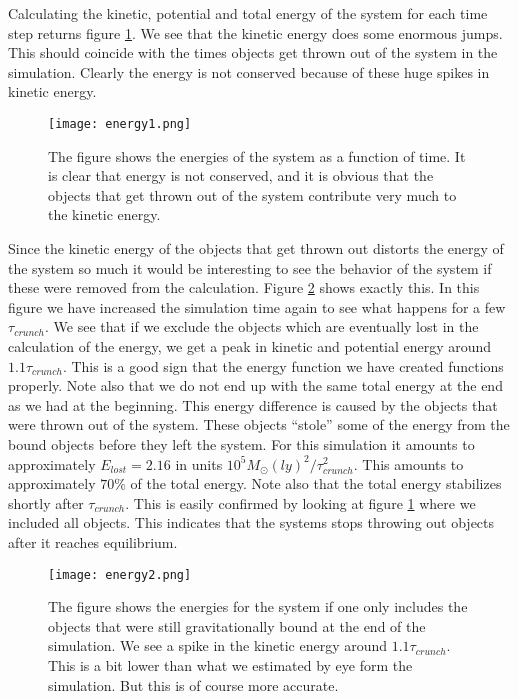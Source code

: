 \documentclass{aa}   %
\begin{document}
Calculating the kinetic, potential and total energy of the system for each time step returns figure \ref{energy1}. We see that the kinetic energy does some enormous jumps. This should coincide with the times objects get thrown out of the system in the simulation. Clearly the energy is not conserved because of these huge spikes in kinetic energy.
\begin{figure}[hbtp]
 \centering
 \texttt{[image: energy1.png]}
 \caption[]{\label{energy1}
   The figure shows the energies of the system as a function of time. It is clear that energy is not conserved, and it is obvious that the objects that get thrown out of the system contribute very much to the kinetic energy. 
 }
\end{figure}
Since the kinetic energy of the objects that get thrown out distorts the energy of the system so much it would be interesting to see the behavior of the system if these were removed from the calculation. Figure \ref{energy2} shows exactly this. In this figure we have increased the simulation time again to see what happens for a few $\tau_{crunch}$. We see that if we exclude the objects which are eventually lost in the calculation of the energy, we get a peak in kinetic and potential energy around $1.1\tau_{crunch}$. This is a good sign that the energy function we have created functions properly. Note also that we do not end up with the same total energy at the end as we had at the beginning. This energy difference is caused by the objects that were thrown out of the system. These objects ``stole'' some of the energy from the bound objects before they left the system. For this simulation it amounts to approximately $E_{lost} = 2.16$ in units $10^5 M_\odot (ly)^2/\tau_{crunch}^2$. This amounts to approximately $70\%$ of the total energy.
Note also that the total energy stabilizes shortly after $\tau_{crunch}$. This is easily confirmed by looking at figure \ref{energy1} where we included all objects. This indicates that the systems stops throwing out objects after it reaches equilibrium.
\begin{figure}[hbtp]
 \centering
 \texttt{[image: energy2.png]}
 \caption[]{\label{energy2}
   The figure shows the energies for the system if one only includes the objects that were still gravitationally bound at the end of the simulation. We see a spike in the kinetic energy around $1.1\tau_{crunch}$. This is a bit lower than what we estimated by eye form the simulation. But this is of course more accurate.
 }
\end{figure}
\end{document}
